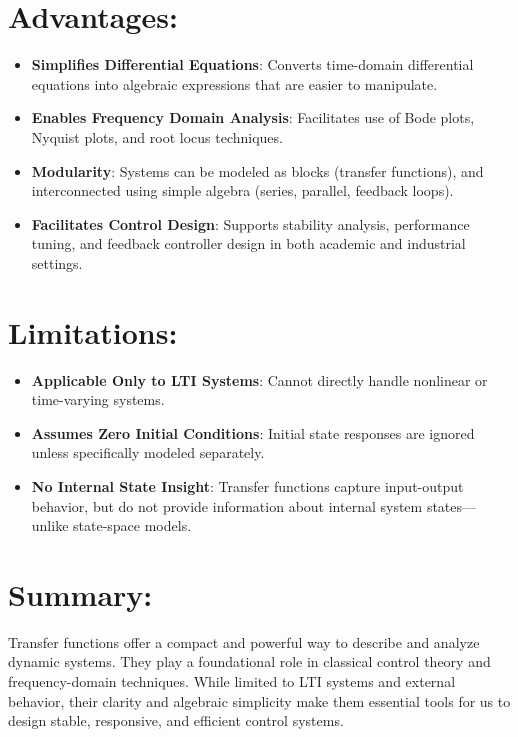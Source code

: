 \documentclass{report}
\begin{document}
\section{Advantages:}
\begin{itemize}
    \item \textbf{Simplifies Differential Equations}: Converts time-domain differential equations into algebraic expressions that are easier to manipulate.
    \item \textbf{Enables Frequency Domain Analysis}: Facilitates use of Bode plots, Nyquist plots, and root locus techniques.
    \item \textbf{Modularity}: Systems can be modeled as blocks (transfer functions), and interconnected using simple algebra (series, parallel, feedback loops).
    \item \textbf{Facilitates Control Design}: Supports stability analysis, performance tuning, and feedback controller design in both academic and industrial settings.
\end{itemize}

\section{Limitations:}
\begin{itemize}
    \item \textbf{Applicable Only to LTI Systems}: Cannot directly handle nonlinear or time-varying systems.
    \item \textbf{Assumes Zero Initial Conditions}: Initial state responses are ignored unless specifically modeled separately.
    \item \textbf{No Internal State Insight}: Transfer functions capture input-output behavior, but do not provide information about internal system states—unlike state-space models.
\end{itemize}

\section{Summary:}
Transfer functions offer a compact and powerful way to describe and analyze dynamic systems. They play a foundational role in classical control theory and frequency-domain techniques.
While limited to LTI systems and external behavior, their clarity and algebraic simplicity make them essential tools for us to design stable, responsive, and efficient control systems.
\end{document}
